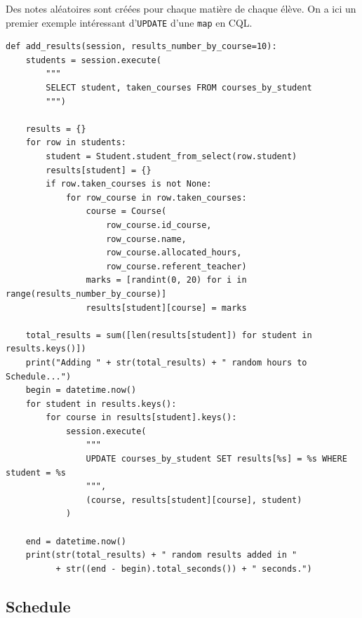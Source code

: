 \documentclass[a4paper, 11pt]{article}
\begin{document}
Des notes aléatoires sont créées pour chaque matière de chaque élève. On a ici un premier exemple intéressant d'\texttt{UPDATE} d'une \texttt{map} en CQL.

\scriptsize
\begin{tcolorbox}
\begin{verbatim}
def add_results(session, results_number_by_course=10):
    students = session.execute(
        """
        SELECT student, taken_courses FROM courses_by_student
        """)

    results = {}
    for row in students:
        student = Student.student_from_select(row.student)
        results[student] = {}
        if row.taken_courses is not None:
            for row_course in row.taken_courses:
                course = Course(
                    row_course.id_course,
                    row_course.name,
                    row_course.allocated_hours,
                    row_course.referent_teacher)
                marks = [randint(0, 20) for i in range(results_number_by_course)]
                results[student][course] = marks

    total_results = sum([len(results[student]) for student in results.keys()])
    print("Adding " + str(total_results) + " random hours to Schedule...")
    begin = datetime.now()
    for student in results.keys():
        for course in results[student].keys():
            session.execute(
                """
                UPDATE courses_by_student SET results[%s] = %s WHERE student = %s
                """,
                (course, results[student][course], student)
            )

    end = datetime.now()
    print(str(total_results) + " random results added in "
          + str((end - begin).total_seconds()) + " seconds.")
\end{verbatim}
\end{tcolorbox}

\normalsize
\subsection{Schedule}
\end{document}
